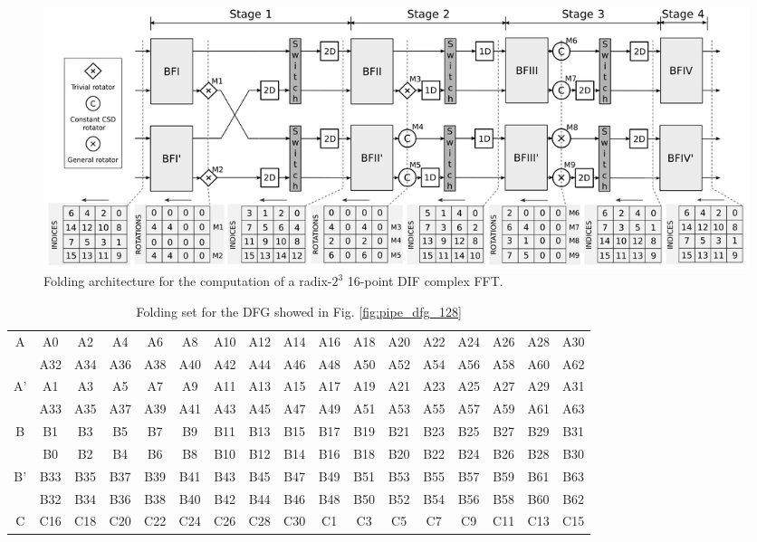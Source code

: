 \documentclass[journal,comsoc]{IEEEtran}
\begin{document}
\begin{figure}[!t]
	\centering
	\includegraphics[width=\linewidth]{Diagramas/folding-16.png}
	\caption{Folding architecture for the computation of a radix-$2^3$ 16-point DIF complex FFT.}
	\label{fig:circ-folding-16}
\end{figure}
\begin{small}
\begin{table}[t!]
	\centering
	\begin{threeparttable}
		\centering
		\caption{Folding set for the DFG showed in Fig. \ref{fig:pipe_dfg_128}}
		\label{tab:fold_set_128} 
		\begin{tabular}{|c||cccccccccccccccc|}
			\hline
			\multirow{2}{*}{A} & A0 & A2 & A4 & A6 & A8 & A10 & A12 & A14 & A16 & A18 & A20 & A22 & A24 & A26 & A28 & A30 \\  
			& A32 & A34 & A36 & A38 & A40 & A42 & A44 & A46 & A48 & A50 & A52 & A54 & A56 & A58 & A60 & A62 \\  
			\hline
			\multirow{2}{*}{A'} & A1 & A3 & A5 & A7 & A9 & A11 & A13 & A15 & A17 & A19 & A21 & A23 & A25 & A27 & A29 & A31 \\  
			& A33 & A35 & A37 & A39 & A41 & A43 & A45 & A47 & A49 & A51 & A53 & A55 & A57 & A59 & A61 & A63 \\  
			\hline
			\multirow{2}{*}{B} & B1 & B3 & B5 & B7 & B9 & B11 & B13 & B15 & B17 & B19 & B21 & B23 & B25 & B27 & B29 & B31 \\  
			& B0 & B2 & B4 & B6 & B8 & B10 & B12 & B14 & B16 & B18 & B20 & B22 & B24 & B26 & B28 & B30 \\  
			\hline
			\multirow{2}{*}{B'} & B33 & B35 & B37 & B39 & B41 & B43 & B45 & B47 & B49 & B51 & B53 & B55 & B57 & B59 & B61 & B63 \\  
			& B32 & B34 & B36 & B38 & B40 & B42 & B44 & B46 & B48 & B50 & B52 & B54 & B56 & B58 & B60 & B62 \\  
			\hline
			\multirow{2}{*}{C} & C16 & C18 & C20 & C22 & C24 & C26 & C28 & C30 & C1 & C3 & C5 & C7 & C9 & C11 & C13 & C15 \\  

\end{tabular}
\end{threeparttable}
\end{table}
\end{small}
\end{document}
